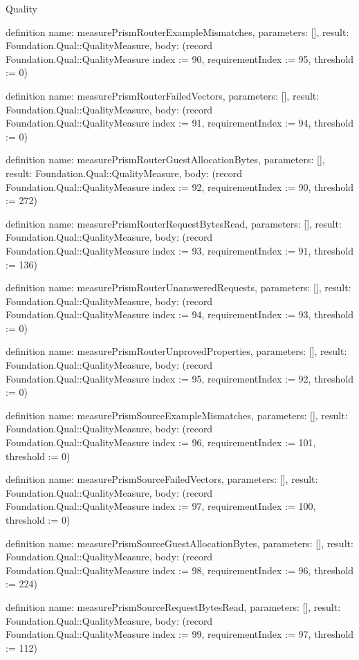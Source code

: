 \begin{lexlean}{Quality}
\begin{semanticmodule}
definition{
  name: measurePrismRouterExampleMismatches,
  parameters: [],
  result: Foundation.Qual::QualityMeasure,
  body: (record Foundation.Qual::QualityMeasure {index := 90, requirementIndex := 95, threshold := 0})
}

definition{
  name: measurePrismRouterFailedVectors,
  parameters: [],
  result: Foundation.Qual::QualityMeasure,
  body: (record Foundation.Qual::QualityMeasure {index := 91, requirementIndex := 94, threshold := 0})
}

definition{
  name: measurePrismRouterGuestAllocationBytes,
  parameters: [],
  result: Foundation.Qual::QualityMeasure,
  body: (record Foundation.Qual::QualityMeasure {index := 92, requirementIndex := 90, threshold := 272})
}

definition{
  name: measurePrismRouterRequestBytesRead,
  parameters: [],
  result: Foundation.Qual::QualityMeasure,
  body: (record Foundation.Qual::QualityMeasure {index := 93, requirementIndex := 91, threshold := 136})
}

definition{
  name: measurePrismRouterUnansweredRequests,
  parameters: [],
  result: Foundation.Qual::QualityMeasure,
  body: (record Foundation.Qual::QualityMeasure {index := 94, requirementIndex := 93, threshold := 0})
}

definition{
  name: measurePrismRouterUnprovedProperties,
  parameters: [],
  result: Foundation.Qual::QualityMeasure,
  body: (record Foundation.Qual::QualityMeasure {index := 95, requirementIndex := 92, threshold := 0})
}

definition{
  name: measurePrismSourceExampleMismatches,
  parameters: [],
  result: Foundation.Qual::QualityMeasure,
  body: (record Foundation.Qual::QualityMeasure {index := 96, requirementIndex := 101, threshold := 0})
}

definition{
  name: measurePrismSourceFailedVectors,
  parameters: [],
  result: Foundation.Qual::QualityMeasure,
  body: (record Foundation.Qual::QualityMeasure {index := 97, requirementIndex := 100, threshold := 0})
}

definition{
  name: measurePrismSourceGuestAllocationBytes,
  parameters: [],
  result: Foundation.Qual::QualityMeasure,
  body: (record Foundation.Qual::QualityMeasure {index := 98, requirementIndex := 96, threshold := 224})
}

definition{
  name: measurePrismSourceRequestBytesRead,
  parameters: [],
  result: Foundation.Qual::QualityMeasure,
  body: (record Foundation.Qual::QualityMeasure {index := 99, requirementIndex := 97, threshold := 112})
}


\end{semanticmodule}
\end{lexlean}
